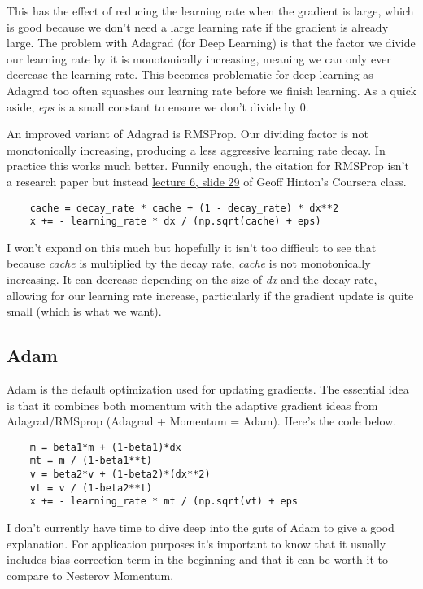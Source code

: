 \documentclass[12pt]{article}
\begin{document}
This has the effect of reducing 
the learning rate when the gradient is large, which is good because we don't need a large learning rate
if the gradient is already large. The problem with Adagrad (for Deep Learning) is that the factor we divide 
our learning rate by it is monotonically increasing, meaning we can only ever decrease the learning rate. 
This becomes problematic for deep learning as Adagrad too often squashes our learning rate before 
we finish learning. As a quick aside, \emph{eps} is a small constant to ensure we don't divide by 0. 

An improved variant of Adagrad is RMSProp. Our dividing factor is not monotonically increasing, 
producing a less aggressive learning rate decay. In practice this works much better. Funnily enough, 
the citation for RMSProp isn't a research paper but instead \href{http://www.cs.toronto.edu/~tijmen/csc321/slides/lecture_slides_lec6.pdf}
{lecture 6, slide 29} of Geoff Hinton's Coursera class. 

\begin{verbatim}
    cache = decay_rate * cache + (1 - decay_rate) * dx**2
    x += - learning_rate * dx / (np.sqrt(cache) + eps)
\end{verbatim}

I won't expand on this much but hopefully it isn't too difficult to see that because 
\emph{cache} is multiplied by the decay rate, \emph{cache} is not monotonically increasing. It can 
decrease depending on the size of \emph{dx} and the decay rate, allowing for our learning 
rate increase, particularly if the gradient update is quite small (which is what we want). 

\subsection{Adam}
Adam is the default optimization used for updating gradients. The essential idea is that it
combines both momentum with the adaptive gradient ideas from Adagrad/RMSprop (Adagrad + Momentum 
= Adam). Here's the code below. 

\begin{verbatim}
    m = beta1*m + (1-beta1)*dx
    mt = m / (1-beta1**t)
    v = beta2*v + (1-beta2)*(dx**2)
    vt = v / (1-beta2**t)
    x += - learning_rate * mt / (np.sqrt(vt) + eps
\end{verbatim}

I don't currently have time to dive deep into the guts of Adam to give a good explanation.
For application purposes it's important to know that it usually includes bias correction term 
in the beginning and that it can be worth it to compare to Nesterov Momentum. 
\end{document}
